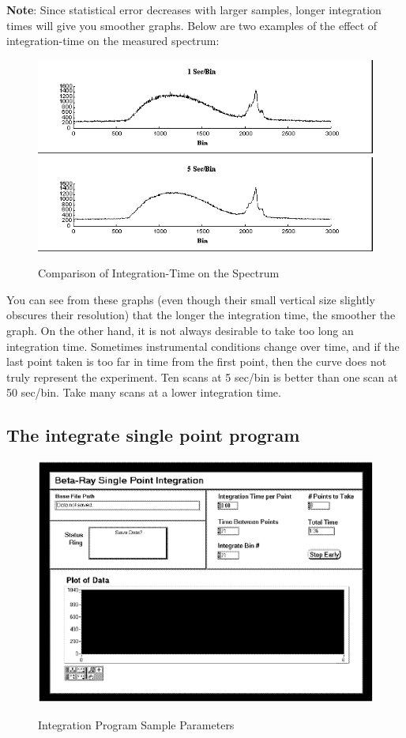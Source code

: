 \documentclass{../lab}
\begin{document}
\textbf{Note}: Since statistical error decreases with larger samples, longer integration times will give you smoother graphs. Below are two examples of the effect of integration-time on the measured spectrum:

\begin{figure}[h]
    \centering
    \href{http://experimentationlab.berkeley.edu/sites/default/files/images/BRAimage035.gif}{\includegraphics[width=0.7\linewidth]{images/BRAimage035.png}} \\
    \href{http://experimentationlab.berkeley.edu/sites/default/files/images/BRAimage036.gif}{\includegraphics[width=0.7\linewidth]{images/BRAimage036.png}}
    \caption{Comparison of Integration-Time on the Spectrum}
\end{figure}

You can see from these graphs (even though their small vertical size slightly obscures their resolution) that the longer the integration time, the smoother the graph. On the other hand, it is not always desirable to take too long an integration time. Sometimes instrumental conditions change over time, and if the last point taken is too far in time from the first point, then the curve does not truly represent the experiment. Ten scans at 5 sec/bin is better than one scan at 50 sec/bin. Take many scans at a lower integration time.

\subsection{The integrate single point program}
\label{subsec:IntegrateSinglePointProgram}

\begin{figure}
\centering
    \href{http://experimentationlab.berkeley.edu/sites/default/files/images/BRAimage037.gif}{\includegraphics[width=0.7\linewidth]{images/BRAimage037.png}}
    \caption{Integration Program Sample Parameters}
\end{figure}
\end{document}
